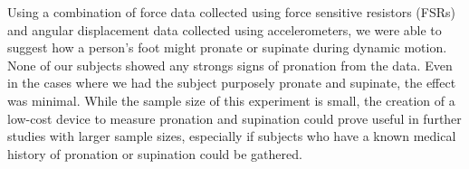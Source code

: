Using a combination of force data collected using force sensitive resistors (FSRs) and angular displacement data collected using accelerometers, we were able to suggest how a person's foot might pronate or supinate during dynamic motion.
None of our subjects showed any strongs signs of pronation from the data.
Even in the cases where we had the subject purposely pronate and supinate, the effect was minimal.
While the sample size of this experiment is small, the creation of a low-cost device to measure pronation and supination could prove useful in further studies with larger sample sizes, especially if subjects who have a known medical history of pronation or supination could be gathered.
